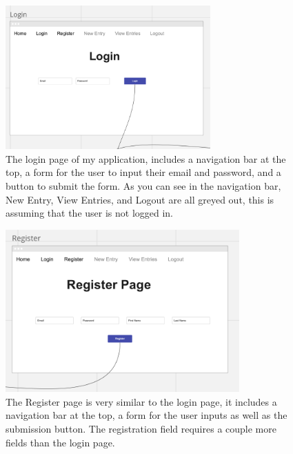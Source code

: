 \begin{figure}[H]
    \centering
    \includegraphics[width=0.7\textwidth]{Assets/login_page.png}
    \caption{The login page of my application, includes a navigation bar at the top, a form for the user to input their email and password, and a button to submit the form. As you can see in the navigation bar, New Entry, View Entries, and Logout are all greyed out, this is assuming that the user is not logged in.}
\end{figure}

\begin{figure}[H]
    \centering
    \includegraphics[width=0.8\textwidth]{Assets/register_page.png}
    \caption{The Register page is very similar to the login page, it includes a navigation bar at the top, a form for the user inputs as well as the submission button. The registration field requires a couple more fields than the login page.}
\end{figure}

